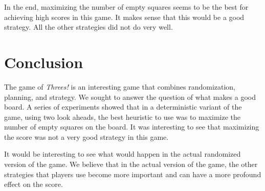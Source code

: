 \documentclass[11pt]{article}
\begin{document}
In the end, maximizing the number of empty squares seems to be the best for achieving high scores in this game. It makes sense that this would be a good strategy. All the other strategies did not do very well. 

\section{Conclusion}

The game of \emph{Threes!} is an interesting game that combines randomization, planning, and strategy. We sought to answer the question of what makes a good board. A series of experiments showed that in a deterministic variant of the game, using two look aheads, the best heuristic to use was to maximize the number of empty squares on the board. It was interesting to see that maximizing the score was not a very good strategy in this game.

It would be interesting to see what would happen in the actual randomized version of the game. We believe that in the actual version of the game, the other strategies that players use become more important and can have a more profound effect on the score.
\end{document}
